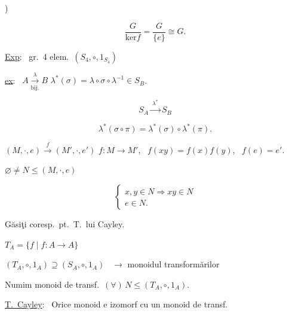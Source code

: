 )

\[
\frac{G}{\text{ker}f} = \frac{G}{\{e\}} \cong G.
\]

\bigskip
\noindent\underline{Exp}: \ gr.\ 4 elem.\ $(S_4,\circ,1_{S_4})$

\bigskip
\noindent\underline{ex}: \ $A \xrightarrow[\text{bij.}]{\ \lambda\ } B$ \qquad $\lambda^*(\sigma) = \lambda\circ\sigma\circ\lambda^{-1} \in S_B$.

\[
S_A \xrightarrow{\ \lambda^*\ } S_B
\]

\[
\lambda^*(\sigma\circ\pi) = \lambda^*(\sigma)\circ\lambda^*(\pi).
\]

\bigskip
\noindent $(M,\cdot,e) \xrightarrow{\ f\ } (M',\cdot,e')$ \quad $f:M\to M'$, \ $f(xy)=f(x)f(y)$, \ $f(e)=e'$.

\bigskip
\noindent $\varnothing \neq N \leq (M,\cdot,e)$

\[
\begin{cases}
x,y\in N \Rightarrow xy\in N\\
e\in N.
\end{cases}
\]

\bigskip
\noindent Găsiţi coresp.\ pt.\ T.\ lui Cayley.

\bigskip
\noindent $T_A = \{f \mid f:A\to A\}$

\noindent $(T_A,\circ,1_A) \supseteq (S_A,\circ,1_A)$ \ $\to$ monoidul transformărilor

\bigskip
\noindent Numim monoid de transf.\ $(\forall)\,N\leq (T_A,\circ,1_A)$.

\bigskip
\noindent\underline{T.\ Cayley}: \ Orice monoid e izomorf cu un monoid de transf.
